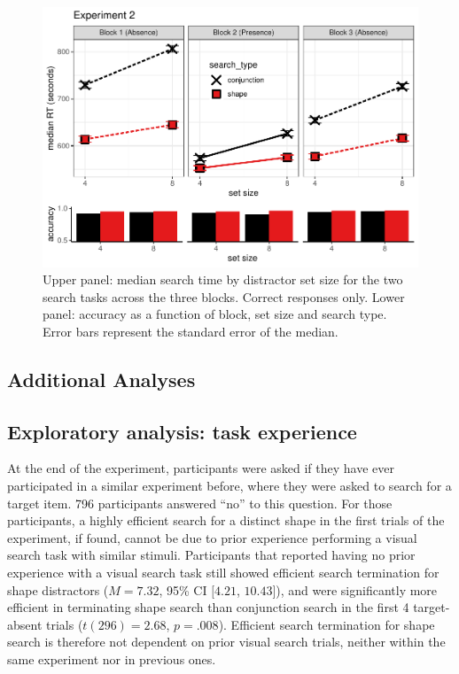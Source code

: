 \documentclass[
  english,
  man]{apa6}
\begin{document}
\begin{figure}[H]
\includegraphics[width=\textwidth]{termination_files/figure-latex/exp2Plot-1} \caption{Upper panel: median search time by distractor set size for the two search tasks across the three blocks. Correct responses only. Lower panel: accuracy as a function of block, set size and search type. Error bars represent the standard error of the median.}\label{fig:exp2Plot}
\end{figure}

\hypertarget{additional-analyses-1}{%
\subsection{Additional Analyses}\label{additional-analyses-1}}

\hypertarget{exploratory-analysis-task-experience}{%
\subsection{Exploratory analysis: task experience}\label{exploratory-analysis-task-experience}}

At the end of the experiment, participants were asked if they have ever participated in a similar experiment before, where they were asked to search for a target item. 796 participants answered \enquote{no} to this question. For those participants, a highly efficient search for a distinct shape in the first trials of the experiment, if found, cannot be due to prior experience performing a visual search task with similar stimuli. Participants that reported having no prior experience with a visual search task still showed efficient search termination for shape distractors (\(M = 7.32\), 95\% CI \([4.21\), \(10.43]\)), and were significantly more efficient in terminating shape search than conjunction search in the first 4 target-absent trials (\(t(296) = 2.68\), \(p = .008\)). Efficient search termination for shape search is therefore not dependent on prior visual search trials, neither within the same experiment nor in previous ones.
\end{document}
